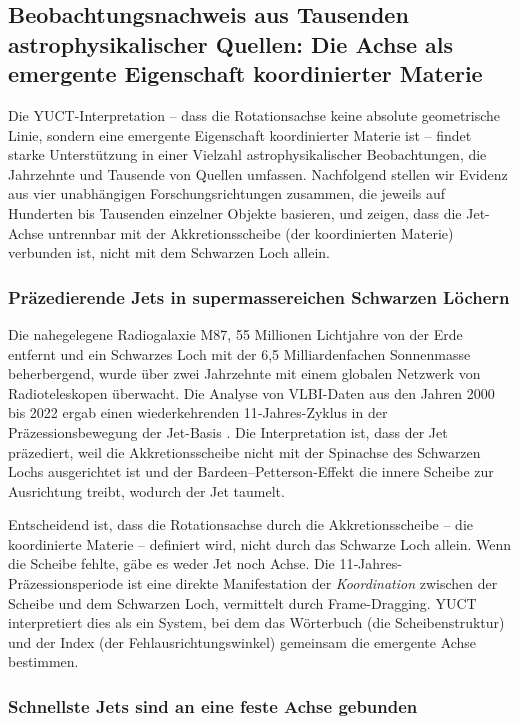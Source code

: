 \documentclass[12pt,a4paper]{article}
\begin{document}
	\subsection{Beobachtungsnachweis aus Tausenden astrophysikalischer Quellen: Die Achse als emergente Eigenschaft koordinierter Materie}
	
	Die YUCT-Interpretation – dass die Rotationsachse keine absolute geometrische Linie, sondern eine emergente Eigenschaft koordinierter Materie ist – findet starke Unterstützung in einer Vielzahl astrophysikalischer Beobachtungen, die Jahrzehnte und Tausende von Quellen umfassen. Nachfolgend stellen wir Evidenz aus vier unabhängigen Forschungsrichtungen zusammen, die jeweils auf Hunderten bis Tausenden einzelner Objekte basieren, und zeigen, dass die Jet-Achse untrennbar mit der Akkretionsscheibe (der koordinierten Materie) verbunden ist, nicht mit dem Schwarzen Loch allein.
	
	\subsubsection{Präzedierende Jets in supermassereichen Schwarzen Löchern}
	
	Die nahegelegene Radiogalaxie M87, 55 Millionen Lichtjahre von der Erde entfernt und ein Schwarzes Loch mit der 6,5 Milliardenfachen Sonnenmasse beherbergend, wurde über zwei Jahrzehnte mit einem globalen Netzwerk von Radioteleskopen überwacht. Die Analyse von VLBI-Daten aus den Jahren 2000 bis 2022 ergab einen wiederkehrenden 11‑Jahres-Zyklus in der Präzessionsbewegung der Jet-Basis \cite{M87Precession2024}. Die Interpretation ist, dass der Jet präzediert, weil die Akkretionsscheibe nicht mit der Spinachse des Schwarzen Lochs ausgerichtet ist und der Bardeen–Petterson-Effekt die innere Scheibe zur Ausrichtung treibt, wodurch der Jet taumelt.
	
	Entscheidend ist, dass die Rotationsachse durch die Akkretionsscheibe – die koordinierte Materie – definiert wird, nicht durch das Schwarze Loch allein. Wenn die Scheibe fehlte, gäbe es weder Jet noch Achse. Die 11‑Jahres-Präzessionsperiode ist eine direkte Manifestation der \emph{Koordination} zwischen der Scheibe und dem Schwarzen Loch, vermittelt durch Frame-Dragging. YUCT interpretiert dies als ein System, bei dem das Wörterbuch (die Scheibenstruktur) und der Index (der Fehlausrichtungswinkel) gemeinsam die emergente Achse bestimmen.
	
	\subsubsection{Schnellste Jets sind an eine feste Achse gebunden}
	
\end{document}
